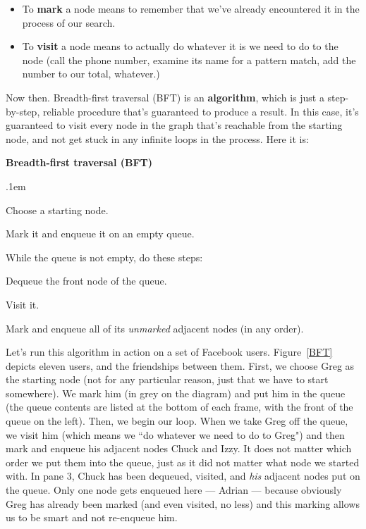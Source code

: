 \begin{itemize} 
\item To \textbf{mark} a node means to remember that we've already
encountered it in the process of our search.
\item To \textbf{visit} a node means to actually do whatever it is we need
to do to the node (call the phone number, examine its name for a pattern
match, add the number to our total, whatever.)
\end{itemize} 

Now then. Breadth-first traversal (BFT) is an \textbf{algorithm}, which is
just a step-by-step, reliable procedure that's guaranteed to produce a
result. In this case, it's guaranteed to visit every node in the graph
that's reachable from the starting node, and not get stuck in any infinite
loops in the process. Here it is:

\vspace{.1in}
\begin{framed}
\textbf{Breadth-first traversal (BFT)}
\begin{compactenum}
\itemsep.1em
\item Choose a starting node.
\item Mark it and enqueue it on an empty queue.
\item While the queue is not empty, do these steps:
    \begin{compactenum}
    \item Dequeue the front node of the queue.
    \item Visit it.
    \item Mark and enqueue all of its \textit{unmarked} adjacent nodes (in
any order).
    \end{compactenum}
\end{compactenum}
\end{framed}
\vspace{.2in}

Let's run this algorithm in action on a set of Facebook users. 
Figure~\ref{BFT} depicts eleven users, and the friendships between them.
First, we choose Greg as the starting node (not for any particular reason,
just that we have to start somewhere). We mark him (in grey on the diagram)
and put him in the queue (the queue contents are listed at the bottom of
each frame, with the front of the queue on the left). Then, we begin our
loop. When we take Greg off the queue, we visit him (which means we ``do
whatever we need to do to Greg") and then mark and enqueue his adjacent
nodes Chuck and Izzy. It does not matter which order we put them into the
queue, just as it did not matter what node we started with. In pane 3,
Chuck has been dequeued, visited, and \textit{his} adjacent nodes put on
the queue. Only one node gets enqueued here --- Adrian --- because
obviously Greg has already been marked (and even visited, no less) and this
marking allows us to be smart and not re-enqueue him.

